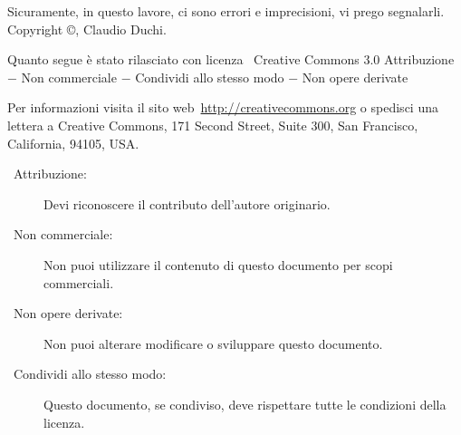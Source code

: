 Sicuramente, in questo lavore, ci sono errori  e  imprecisioni, vi  prego segnalarli.
\vfill
Copyright \copyright\@ \the\year, Claudio Duchi.

Quanto segue è stato rilasciato con licenza \ccLogo\ Creative Commons   3.0 Attribuzione $-$ Non commerciale $-$ Condividi allo stesso modo $-$ Non opere derivate

Per informazioni visita il sito web\ \url{http://creativecommons.org} o spedisci una lettera a Creative Commons, 171 Second Street, Suite 300, San Francisco, California, 94105, USA.

\begin{description}
\item[\ccAttribution\ Attribuzione:] Devi riconoscere il contributo dell'autore originario.
\item [\ccNonCommercial\ Non commerciale:] Non puoi utilizzare il contenuto di questo documento per scopi commerciali.
\item [\ccNoDerivatives\ Non opere derivate:]  Non puoi alterare modificare o sviluppare questo documento.
\item [\ccShareAlike\ Condividi allo stesso modo:]  Questo documento, se condiviso, deve rispettare tutte le condizioni della licenza.
\end{description}

